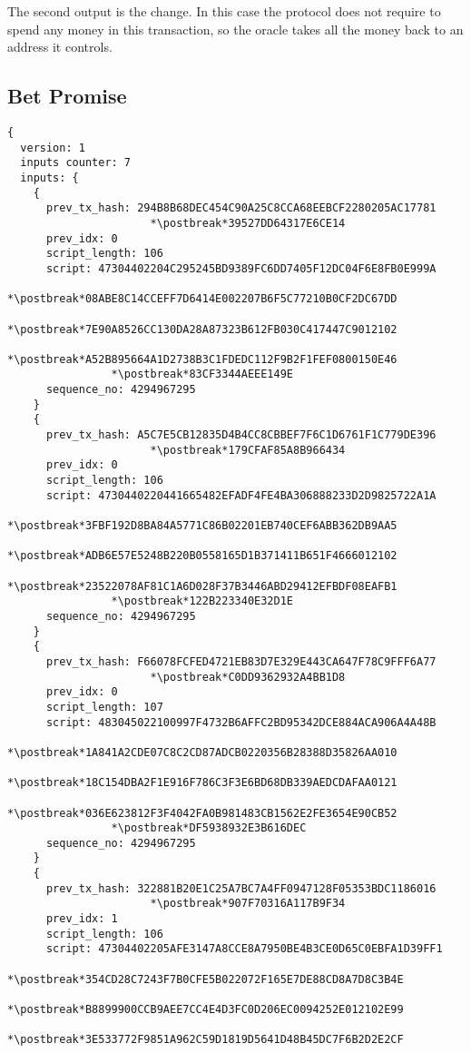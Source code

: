 The second output is the change.
In this case the protocol does not require to spend any money in this
  transaction, so the oracle takes all the money back to an address it controls.

\subsection{Bet Promise}

\begin{lstlisting}
{
  version: 1
  inputs counter: 7
  inputs: {
    {
      prev_tx_hash: 294B8B68DEC454C90A25C8CCA68EEBCF2280205AC17781
                      *\postbreak*39527DD64317E6CE14
      prev_idx: 0
      script_length: 106
      script: 47304402204C295245BD9389FC6DD7405F12DC04F6E8FB0E999A
                *\postbreak*08ABE8C14CCEFF7D6414E002207B6F5C77210B0CF2DC67DD
                *\postbreak*7E90A8526CC130DA28A87323B612FB030C417447C9012102
                *\postbreak*A52B895664A1D2738B3C1FDEDC112F9B2F1FEF0800150E46
                *\postbreak*83CF3344AEEE149E
      sequence_no: 4294967295
    }
    {
      prev_tx_hash: A5C7E5CB12835D4B4CC8CBBEF7F6C1D6761F1C779DE396
                      *\postbreak*179CFAF85A8B966434
      prev_idx: 0
      script_length: 106
      script: 4730440220441665482EFADF4FE4BA306888233D2D9825722A1A
                *\postbreak*3FBF192D8BA84A5771C86B02201EB740CEF6ABB362DB9AA5
                *\postbreak*ADB6E57E5248B220B0558165D1B371411B651F4666012102
                *\postbreak*23522078AF81C1A6D028F37B3446ABD29412EFBDF08EAFB1
                *\postbreak*122B223340E32D1E
      sequence_no: 4294967295
    }
    {
      prev_tx_hash: F66078FCFED4721EB83D7E329E443CA647F78C9FFF6A77
                      *\postbreak*C0DD9362932A4BB1D8
      prev_idx: 0
      script_length: 107
      script: 483045022100997F4732B6AFFC2BD95342DCE884ACA906A4A48B
                *\postbreak*1A841A2CDE07C8C2CD87ADCB0220356B28388D35826AA010
                *\postbreak*18C154DBA2F1E916F786C3F3E6BD68DB339AEDCDAFAA0121
                *\postbreak*036E623812F3F4042FA0B981483CB1562E2FE3654E90CB52
                *\postbreak*DF5938932E3B616DEC
      sequence_no: 4294967295
    }
    {
      prev_tx_hash: 322881B20E1C25A7BC7A4FF0947128F05353BDC1186016
                      *\postbreak*907F70316A117B9F34
      prev_idx: 1
      script_length: 106
      script: 47304402205AFE3147A8CCE8A7950BE4B3CE0D65C0EBFA1D39FF1
                *\postbreak*354CD28C7243F7B0CFE5B022072F165E7DE88CD8A7D8C3B4E
                *\postbreak*B8899900CCB9AEE7CC4E4D3FC0D206EC0094252E012102E99
                *\postbreak*3E533772F9851A962C59D1819D5641D48B45DC7F6B2D2E2CF

\end{lstlisting}
